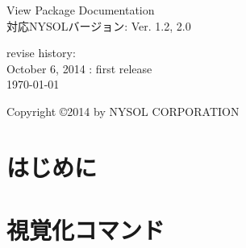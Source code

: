 \documentclass[a4paper]{jsbook}
\begin{document}
\begin{titlepage}
\begin{center}
{\huge View Package Documentation}\\
\vspace{10truept}
{\normalsize 対応NYSOLバージョン: Ver. 1.2, 2.0}\\
\vspace{1cm}

revise history:\\
October 6, 2014 : first release\\
\vspace{18cm}
{\small \today}

{\small Copyright \copyright 2014 by NYSOL CORPORATION}
\end{center}
\end{titlepage}

\setcounter{tocdepth}{1}
\tableofcontents


\chapter{はじめに}



\chapter{視覚化コマンド}






%
\end{document}
